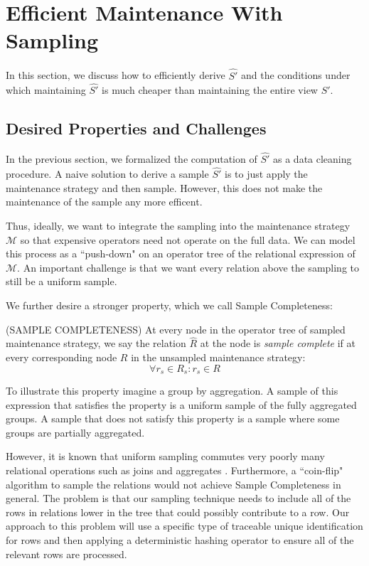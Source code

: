 \section{Efficient Maintenance With Sampling}
In this section, we discuss how to efficiently derive $\hat{S'}$ and the conditions under which
maintaining $\hat{S'}$ is much cheaper than maintaining the entire view $S'$.

\subsection{Desired Properties and Challenges}
In the previous section, we formalized the computation of $\hat{S'}$  as a data cleaning procedure.
A naive solution to derive a sample $\hat{S'}$ is to just apply the maintenance strategy and then sample.
However, this does not make the maintenance of the sample any more efficent.

Thus, ideally, we want to integrate the sampling into the maintenance strategy $\mathcal{M}$ so that expensive operators
need not operate on the full data.
We can model this process as a ``push-down" on an operator tree of the relational expression of $\mathcal{M}$.
An important challenge is that we want every relation above the sampling  to still be a uniform sample.

We further desire a stronger property, which we call Sample Completeness:
\begin{definition} (SAMPLE COMPLETENESS) At every node in the operator tree  of sampled maintenance strategy, we say the relation $\hat{R}$ at the node is \emph{sample complete} if at every corresponding node $R$ in the unsampled maintenance strategy:
\[ \forall r_s \in R_s : r_s \in R \]
\end{definition}
To illustrate this property imagine a group by aggregation.
A sample of this expression that satisfies the property is a uniform sample of the fully aggregated groups.
A sample that does not satisfy this property is a sample where some groups are partially aggregated.

However, it is known that uniform sampling commutes very poorly many relational operations such as joins and aggregates \cite{chaudhuri1999random}.
Furthermore, a ``coin-flip" algorithm to sample the relations would not achieve Sample Completeness in general.
The problem is that our sampling technique needs to include all of the rows in relations lower in the tree that could possibly contribute to a row.
Our approach to this problem will use a specific type of traceable unique identification for rows and then applying a deterministic hashing operator to ensure all of the relevant rows are processed.

